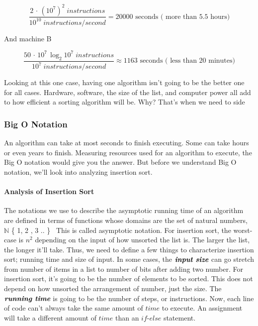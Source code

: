 \documentclass[12pt]{article}
\begin{document}
	$$\frac{2\,\cdot\,(10^7)^2 \;instructions}{10^{10} \;instructions/\!second}=20000\mbox{ seconds ( more than 5.5 hours)}$$
	
	And machine B
	
	$$\frac{50\,\cdot\,10^7\,\log_2{10^7}\;instructions}{10^{7} \;instructions/\!second}\approx1163\mbox{ seconds ( less than 20 minutes)}$$
	                                                                                 
	Looking at this one case, having one algorithm isn't going to be the better one for all cases. Hardware, software, the size of the list, and computer power all add to how efficient a sorting algorithm will be. Why? That's when we need to side 
	                                                                                 
	\subsubsection{Big O Notation}
	
	An algorithm can take at most seconds to finish executing.
	Some can take hours or even years to finish.
	Measuring resources used for an algorithm to execute, the Big O notation would give you the answer.
	But before we understand Big O notation, we’ll look into analyzing insertion sort.
	
	\paragraph{Analysis of Insertion Sort}
	
	The notations we use to describe the asymptotic running time of an algorithm are defined in terms of functions whose domains are the set of natural numbers, $\mathbb{N}$ \{ 1, 2 , 3 .. \}~\cite[p.~43]{intro}
	This is called asymptotic notation.
	For insertion sort, the worst-case is $n^2$ depending on the input of how unsorted the list is.
	The larger the list, the longer it'll take. Thus, we need to define a few things to characterize insertion sort; running time and size of input.
	In some cases, the $\textit{\textbf{input size}}$ can go stretch from number of items in a list to number of bits after adding two number. 
	For insertion sort, it’s going to be the number of elements to be sorted.
	This does not depend on how unsorted the arrangement of number, just the size.
	The $\textit{\textbf{running time}}$ is going to be the number of steps, or instructions.
	Now, each line of code can't always take the same amount of $\textit{time}$ to execute.
	An assignment will take a different amount of $\textit{time}$ than an $\textit{if-else}$ statement.
	
\end{document}
